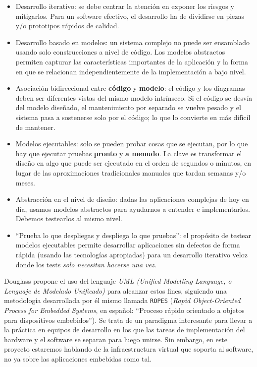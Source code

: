 \begin{itemize}
	\item Desarrollo iterativo: se debe centrar la atención en exponer los riesgos y mitigarlos. Para un software efectivo, el desarrollo ha de dividirse en piezas y/o prototipos rápidos de calidad.
	\item Desarrollo basado en modelos: un sistema complejo no puede ser ensamblado usando solo construcciones a nivel de código. Los modelos abstractos permiten capturar las características importantes de la aplicación y la forma en que se relacionan independientemente de la implementación a bajo nivel.
	\item Asociación bidireccional entre \textbf{código} y \textbf{modelo}: el código y los diagramas deben ser diferentes vistas del mismo modelo intrínseco. Si el código se desvía del modelo diseñado, el mantenimiento por separado se vuelve pesado y el sistema pasa a sostenerse solo por el código; lo que lo convierte en más difícil de mantener.
	\item Modelos ejecutables: solo se pueden probar cosas que se ejecutan, por lo que hay que ejecutar pruebas \textbf{pronto} y \textbf{a menudo}. La clave es transformar el diseño en algo que puede ser ejecutado en el orden de segundos o minutos, en lugar de las aproximaciones tradicionales manuales que tardan semanas y/o meses.
	\item Abstracción en el nivel de diseño: dadas las aplicaciones complejas de hoy en día, usamos modelos abstractos para ayudarnos a entender e implementarlos. Debemos testearlos al mismo nivel.
	\item ``Prueba lo que despliegas y despliega lo que pruebas'': el propósito de testear modelos ejecutables permite desarrollar aplicaciones sin defectos de forma rápida (usando las tecnologías apropiadas) para un desarrollo iterativo veloz donde los tests \textit{solo necesitan hacerse una vez}.
\end{itemize}

Douglass propone el uso del lenguaje \textit{UML (Unified Modelling Language, o Lenguaje de Modelado Unificado)} para alcanzar estos fines, siguiendo una metodología desarrollada por él mismo llamada \texttt{ROPES} (\textit{Rapid Object-Oriented Process for Embedded Systems}, en español: ``Proceso rápido orientado a objetos para dispositivos embebidos''). Se trata de un paradigma interesante para llevar a la práctica en equipos de desarrollo en los que las tareas de implementación del hardware y el software se separan para luego unirse. Sin embargo, en este proyecto estaremos hablando de la infraestructura virtual que soporta al software, no ya sobre las aplicaciones embebidas como tal.

